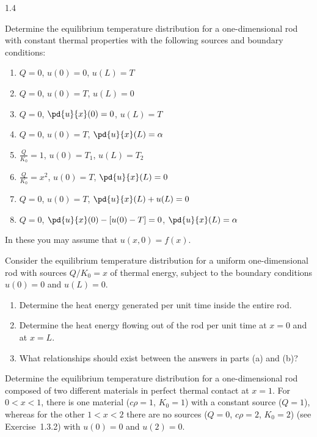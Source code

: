 \begin{exercises}{1.4}

\item Determine the equilibrium temperature distribution for a one-dimensional rod with constant thermal properties with the following sources and boundary conditions:
\begin{enumerate}
\item[\starred (a)] $Q = 0$, \quad $u(0) = 0$, \quad $u(L) = T$
\item[(b)] $Q = 0$, \quad $u(0) = T$, \quad $u(L) = 0$
\item[(c)] $Q = 0$, \quad $\displaystyle\pd{u}{x}(0) = 0$, \quad $u(L) = T$
\item[\starred (d)] $Q = 0$, \quad $u(0) = T$, \quad $\displaystyle\pd{u}{x}(L) = \alpha$
\item[(e)] $\displaystyle\frac{Q}{K_0} = 1$, \quad $u(0) = T_1$, \quad $u(L) = T_2$
\item[\starred (f)] $\displaystyle\frac{Q}{K_0} = x^2$, \quad $u(0) = T$, \quad $\displaystyle\pd{u}{x}(L) = 0$
\item[(g)] $Q = 0$, \quad $u(0) = T$, \quad $\displaystyle\pd{u}{x}(L) + u(L) = 0$
\item[\starred (h)] $Q = 0$, \quad $\displaystyle\pd{u}{x}(0) - [u(0) - T] = 0$, \quad $\displaystyle\pd{u}{x}(L) = \alpha$
\end{enumerate}
In these you may assume that $u(x,0) = f(x)$.

\item Consider the equilibrium temperature distribution for a uniform one-dimensional rod with sources $Q/K_0 = x$ of thermal energy, subject to the boundary conditions $u(0) = 0$ and $u(L) = 0$.
\begin{enumerate}
\item[\starred (a)] Determine the heat energy generated per unit time inside the entire rod.
\item[(b)] Determine the heat energy flowing out of the rod per unit time at $x = 0$ and at $x = L$.
\item[(c)] What relationships should exist between the answers in parts (a) and (b)?
\end{enumerate}

\item Determine the equilibrium temperature distribution for a one-dimensional rod composed of two different materials in perfect thermal contact at $x = 1$. For $0 < x < 1$, there is one material ($c\rho = 1$, $K_0 = 1$) with a constant source ($Q = 1$), whereas for the other $1 < x < 2$ there are no sources ($Q = 0$, $c\rho = 2$, $K_0 = 2$) (see Exercise~1.3.2) with $u(0) = 0$ and $u(2) = 0$.


\end{exercises}
